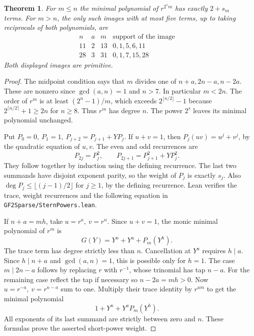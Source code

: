 \documentclass[11pt]{article}
\newtheorem{theorem}{Theorem}
\begin{document}
\begin{theorem}
For \(m\le n\) the minimal polynomial of \(r^{2^s m}\) has exactly
\(2+s_m\) terms. For \(m>n\), the only such images with at most five
terms, up to taking reciprocals of both polynomials, are
\[
\begin{array}{c|c|c|c}
n&a&m&\text{support of the image}\\\hline
11&2&13&0,1,5,6,11\\
28&3&31&0,1,7,15,28
\end{array}
\]
Both displayed images are primitive.
\end{theorem}

\begin{proof}
The midpoint condition says that \(m\) divides one of \(n+a,2n-a,n-2a\).
These are nonzero since \(\gcd(a,n)=1\) and \(n>7\). In particular
\(m<2n\). The order of \(r^m\) is at least \((2^n-1)/m\), which exceeds
\(2^{\lfloor n/2\rfloor}-1\) because \(2^{\lceil n/2\rceil}+1\ge2n\)
for \(n\ge8\). Thus \(r^m\) has degree \(n\). The power \(2^s\) leaves
its minimal polynomial unchanged.

Put \(P_0=0,\ P_1=1,\ P_{j+2}=P_{j+1}+Y P_j\). If \(u+v=1\), then
\(P_j(uv)=u^j+v^j\), by the quadratic equation of \(u,v\). The even and
odd recurrences are
\[
 P_{2j}=P_j^2,\qquad P_{2j+1}=P_{j+1}^2+Y P_j^2.
\]
They follow together by induction using the defining recurrence. The
last two summands have disjoint exponent parity, so the weight of
\(P_j\) is exactly \(s_j\). Also \(\deg P_j\le\lfloor(j-1)/2\rfloor\)
for \(j\ge1\), by the defining recurrence. Lean verifies the trace,
weight recurrences and the following equation in
\nolinkurl{GF2Sparse/SternPowers.lean}.

If \(n+a=mh\), take \(u=r^a,\ v=r^n\). Since \(u+v=1\), the monic
minimal polynomial of \(r^m\) is
\[
                  G(Y)=Y^n+Y^a+P_m(Y^h).
\]
The trace term has degree strictly less than \(n\). Cancellation at
\(Y^a\) requires \(h\mid a\). Since \(h\mid n+a\) and \(\gcd(a,n)=1\),
this is possible only for \(h=1\). The case \(m\mid 2n-a\) follows
by replacing \(r\) with \(r^{-1}\), whose trinomial has tap \(n-a\).
For the remaining case reflect the tap if necessary so \(n-2a=mh>0\).
Now \(u=r^{-a},\ v=r^{n-a}\) sum to one. Multiply their trace identity
by \(r^{am}\) to get the minimal polynomial
\[
                     1+Y^n+Y^a P_m(Y^h).
\]
All exponents of its last summand are strictly between zero and \(n\).
These formulas prove the asserted short-power weight.


\end{proof}
\end{document}
